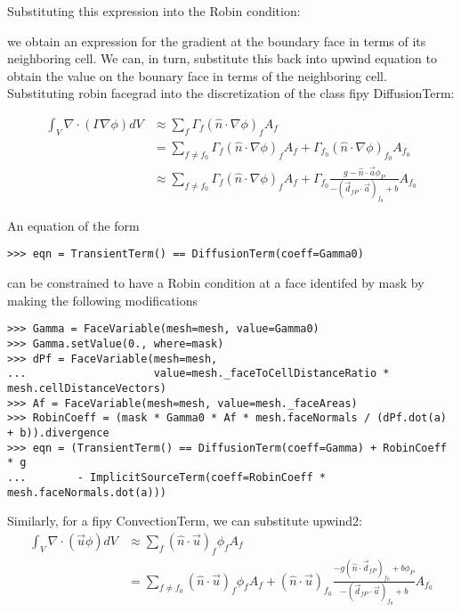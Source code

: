 \documentclass{article}
\begin{document}
Substituting this expression into the Robin condition:

we obtain an expression for the gradient at the boundary face in terms of its neighboring cell. We can, in turn, substitute this back into upwind equation
to obtain the value on the bounary face in terms of the neighboring cell.
Substituting robin facegrad into the discretization of the class fipy DiffusionTerm:

\begin{equation*}
\begin{aligned}
\int_V \nabla\cdot\left(\Gamma\nabla\phi\right) dV &\approx
\sum_f \Gamma_f \left(\hat{n}\cdot\nabla\phi\right)_f A_f \\
&= \sum_{f\neq f_0} \Gamma_f \left(\hat{n}\cdot\nabla\phi\right)_f A_f
+ \Gamma_{f_0} \left(\hat{n}\cdot\nabla\phi\right)_{f_0} A_{f_0} \\
&\approx \sum_{f\neq f_0} \Gamma_f \left(\hat{n}\cdot\nabla\phi\right)_f A_f
+ \Gamma_{f_0} \frac{g - \hat{n}\cdot\vec{a} \phi_P}
                    {-\left(\vec{d}_{fP}\cdot\vec{a}\right)_{f_0} + b} A_{f_0}
\end{aligned}
\end{equation*} 

An equation of the form
\begin{verbatim}
>>> eqn = TransientTerm() == DiffusionTerm(coeff=Gamma0)
\end{verbatim} 
can be constrained to have a Robin condition at a face identifed by mask by making the following modifications
\begin{verbatim}
>>> Gamma = FaceVariable(mesh=mesh, value=Gamma0)
>>> Gamma.setValue(0., where=mask)
>>> dPf = FaceVariable(mesh=mesh,
...                    value=mesh._faceToCellDistanceRatio * mesh.cellDistanceVectors)
>>> Af = FaceVariable(mesh=mesh, value=mesh._faceAreas)
>>> RobinCoeff = (mask * Gamma0 * Af * mesh.faceNormals / (dPf.dot(a) + b)).divergence
>>> eqn = (TransientTerm() == DiffusionTerm(coeff=Gamma) + RobinCoeff * g
...        - ImplicitSourceTerm(coeff=RobinCoeff * mesh.faceNormals.dot(a)))
\end{verbatim} 

Similarly, for a fipy ConvectionTerm, we can substitute upwind2:
\begin{equation*}
\begin{aligned}
\int_V \nabla\cdot\left(\vec{u}\phi\right) dV &\approx
\sum_f \left(\hat{n}\cdot\vec{u}\right)_f \phi_f A_f \\
&= \sum_{f\neq f_0} \left(\hat{n}\cdot\vec{u}\right)_f \phi_f A_f
+ \left(\hat{n}\cdot\vec{u}\right)_{f_0}
     \frac{-g \left(\hat{n}\cdot\vec{d}_{fP}\right)_{f_0} + b\phi_P}
          {- \left(\vec{d}_{fP}\cdot\vec{a}\right)_{f_0} + b} A_{f_0}
\end{aligned}
\end{equation*}
\end{document}
